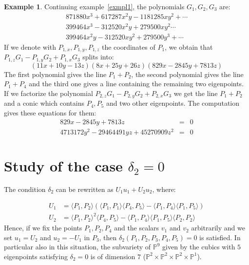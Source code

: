 \documentclass{amsart}
\theoremstyle{plain}
\theoremstyle{definition}
\newtheorem{example}[theorem]{Example}
\begin{document}
\begin{example}
  Continuing example~\ref{exmpl1}, the polynomials $G_1, G_2, G_3$ are:
\[
  \begin{array}{l}
    871880x^3 + 617287 x^2y - 1181285xy^2 + \cdots\\
    399464x^3 - 312520x^2y + 279500xy^2 \cdots\\
    399464x^2y - 312520xy^2 + 279500y^3 +\cdots
  \end{array}
  \]
  If we denote with $P_{1,x}, P_{1,y}, P_{1,z}$ the coordinates of $P_1$, we
  obtain that $P_{1,z}G_1-P_{1,y}G_2+P_{1, x}G_3$ splits into:
  \[
    (11x + 10y - 13z) (8x + 25y + 26z) (829x - 2845y + 7813z) 
  \]
  The first polynomial gives the line $P_1+P_2$,
  the second polynomial gives the line $P_1+P_4$ and the third one gives a line
  containing the remaining two eigenpoints.
  If we factorize the polynomial $P_{2,z}G_1-P_{2,y}G_2+P_{2,x}G_3$ we get
  the line $P_1+P_2$ and a conic which contains $P_4, P_5$ and two other
  eigenpoints. The computation gives these equations for them:
  \begin{eqnarray*}
    829x - 2845y + 7813z & = & 0 \\
    4713172y^2 - 29464491yz + 45270909z^2 & = & 0
  \end{eqnarray*}
\end{example}


\section{Study of the case  $\delta_2 =0$}

The condition $\delta_2$ can be rewritten as
$U_1u_1+U_2u_2$, where:

\begin{equation}
  \begin{split}
    U_1 & =  \langle P_1, P_2\rangle \left(\langle P_1, P_1\rangle
  \langle P_4,P_5\rangle - \langle P_1, P_4\rangle \langle P_1, P_5\rangle
  \right)\\
  U_2 & =  \langle P_1, P_2\rangle^2\langle P_4, P_5\rangle
  -\langle P_1, P_4\rangle \langle P_1, P_5\rangle \langle P_2, P_2\rangle
  \label{sst2}
  \end{split}
\end{equation}
Hence, if we fix the points $P_1, P_2, P_4$ and the scalars $v_1$ and $v_2$
arbitrarily and we set $u_1 = U_2$ and $u_2 = -U_1$ in $P_3$, then
$\delta_2(P_1, P_2, P_3, P_4, P_5) = 0$ is satisfied.
In particular also in this situation, the subvariety of $\mathbb{P}^9$
given by the cubics with $5$ eigenpoints satisfying $\delta_2=0$
is of dimension $7$
($\mathbb{P}^2 \times \mathbb{P}^2\times \mathbb{P}^2\times \mathbb{P}^1$).
\end{document}
